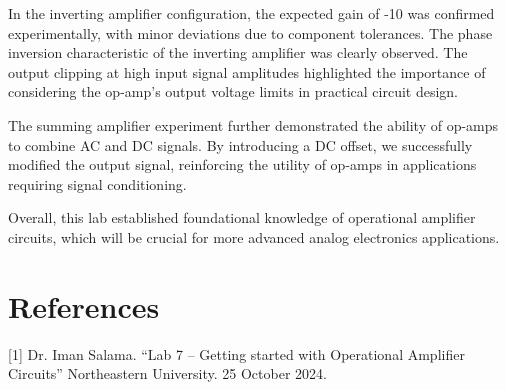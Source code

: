 \documentclass[12pt]{article}
\begin{document}
In the inverting amplifier configuration, the expected gain of 
-10 was confirmed experimentally, with minor deviations due to 
component tolerances. The phase inversion characteristic of the 
inverting amplifier was clearly observed. The output clipping at high 
input signal amplitudes highlighted the importance of considering the 
op-amp's output voltage limits in practical circuit design.
\newline

The summing amplifier experiment further demonstrated the ability of 
op-amps to combine AC and DC signals. By introducing a DC offset, we 
successfully modified the output signal, reinforcing the utility of 
op-amps in applications requiring signal conditioning.
\newline

Overall, this lab established foundational knowledge of operational 
amplifier circuits, which will be crucial for more advanced analog 
electronics applications.


\section{References}
 [1] Dr. Iman Salama. “Lab 7 – Getting started with Operational Amplifier Circuits” Northeastern University. 25 October 2024.
\end{document}
